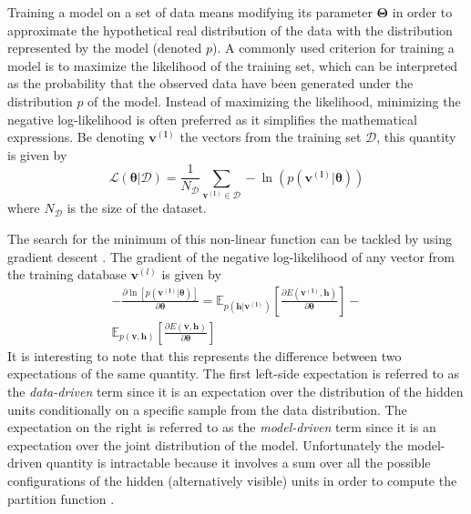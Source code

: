 \documentclass{article}
\begin{document}
Training a model on a set of data means modifying its parameter $\bm{\Theta}$ in order to approximate the hypothetical real distribution of the data with the distribution represented by the model (denoted $p$).
A commonly used criterion for training a model is to maximize the likelihood of the training set, which can be interpreted as the probability that the observed data have been generated under the distribution $p$ of the model.
Instead of maximizing the likelihood, minimizing the negative log-likelihood is often preferred as it simplifies the mathematical expressions. Be denoting $\bm{v^{(l)}}$ the vectors from the training set $\mathcal{D}$, this quantity is given by
\begin{equation}
\label{eq:likelihood}
\mathcal{L(\bm{\theta}|\mathcal{D})}  = \frac{1}{N_{\mathcal{D}}} \sum_{\bm{v^{(l)}} \in \mathcal{D}} - \ln \left( p(\bm{v^{(l)}}|\bm{\theta})\right)
\end{equation}
where $N_{\mathcal{D}}$ is the size of the dataset. 

The search for the minimum of this non-linear function can be tackled by using gradient descent \cite{bottou2010large}. The gradient of the negative log-likelihood of any vector from the training database $\bm{v}^{(l)}$ is given by
\begin{equation}
\label{eq:loglik}
\begin{split}
- \frac{\partial \ln \left[ p(\bm{v^{(l)}}|\bm{\theta})\right]}{\partial \bm{\theta}} 
= 
\mathbb{E}_{p(\bm{h}|\bm{v^{(l)}})} \left[ \frac{\partial E(\bm{v^{(l)}},\bm{h})}{\partial \bm{\theta}} \right] 
- \\
\mathbb{E}_{p(\bm{v} , \bm{h})} \left[ \frac{\partial E(\bm{v},\bm{h})}{\partial \bm{\theta}} \right]
\end{split}
\end{equation}
It is interesting to note that this represents the difference between two expectations of the same quantity. The first left-side expectation is referred to as the \textit{data-driven} term since it is an expectation over the distribution of the hidden units conditionally on a specific sample from the data distribution. The expectation on the right is referred to as the \textit{model-driven} term since it is an expectation over the joint distribution of the model.
Unfortunately the model-driven quantity is intractable because it involves a sum over all the possible configurations of the hidden (alternatively visible) units in order to compute the partition function \cite{Fischer2012}.
\end{document}

